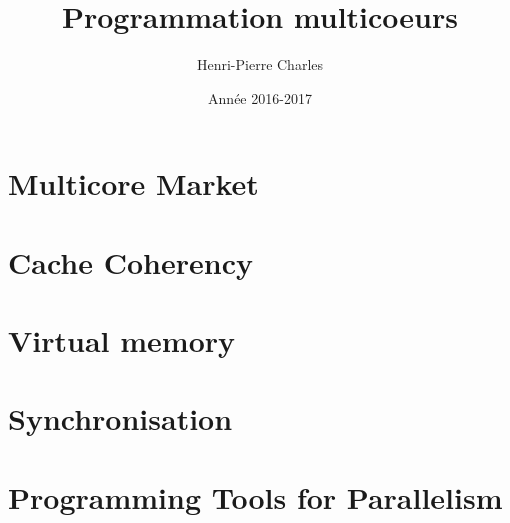 \documentclass{beamer}
\title{Programmation multicoeurs}
\subtitle{}
\author{Henri-Pierre Charles}
\date{Année 2016-2017}
\newcommand{\Slide}[1]{}
\begin{document}
\begin{frame}
\titlepage
\end{frame}


\section{Multicore Market}
\Slide{Market/MotivatingExample1}
\section{Cache Coherency}
\Slide{Caches/Intro}

\section{Virtual memory}
\Slide{VirtualMemory/Intro}

\section{Synchronisation}
\Slide{VirtualMemory/Synchro}

\section{Programming Tools for Parallelism}
\Slide{ProgrammingTools/Intro}
\end{document}
